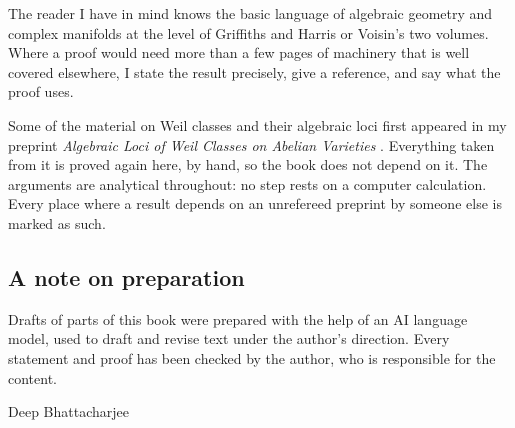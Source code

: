 The reader I have in mind knows the basic language of algebraic geometry
and complex manifolds at the level of Griffiths and Harris or Voisin's two
volumes. Where a proof would need more than a few pages of machinery that
is well covered elsewhere, I state the result precisely, give a reference,
and say what the proof uses.

Some of the material on Weil classes and their algebraic loci first
appeared in my preprint \emph{Algebraic Loci of Weil Classes on Abelian
Varieties} \cite{BhH8}. Everything taken from it is proved again here, by
hand, so the book does not depend on it. The arguments are analytical
throughout: no step rests on a computer calculation. Every place where a
result depends on an unrefereed preprint by someone else is marked as such.

\subsection*{A note on preparation}
Drafts of parts of this book were prepared with the help of an AI language
model, used to draft and revise text under the author's direction. Every
statement and proof has been checked by the author, who is responsible for
the content.

\bigskip
\noindent Deep Bhattacharjee
